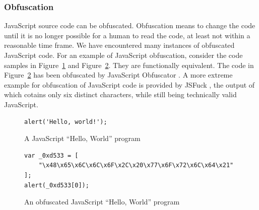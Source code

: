 \documentclass[
    fontsize=12pt,
    headings=small,
    parskip=half,
    bibliography=totoc,
    numbers=noenddot,
    open=any
    ]{scrreprt}
\begin{document}
\subsubsection{Obfuscation}
\label{fundamentals:obfuscation}
JavaScript source code can be obfuscated. Obfuscation means to change the code
until it is no longer possible for a human to read the code, at least not within
a reasonable time frame. We have encountered many instances of obfuscated JavaScript
code. For an example of JavaScript obfuscation, consider the code samples in
Figure~\ref{code:javascript_hello_world} and Figure~\ref{code:javascript_obfuscated}.
They are functionally equivalent. The code in Figure~\ref{code:javascript_obfuscated}
has been obfuscated by JavaScript Obfuscator \cite{jsobfuscator}.
A more extreme example for obfuscation of JavaScript code is provided by JSFuck \cite{jsfuck},
the output of which cotains only six distinct characters, while still being technically valid JavaScript.

\begin{figure}
\centering
\begin{verbatim}
alert('Hello, world!');
\end{verbatim}
\caption{A JavaScript ``Hello, World'' program}
\label{code:javascript_hello_world}
\end{figure}

\begin{figure}
\centering
\begin{verbatim}
var _0xd533 = [
    "\x48\x65\x6C\x6C\x6F\x2C\x20\x77\x6F\x72\x6C\x64\x21"
];
alert(_0xd533[0]);
\end{verbatim}
\caption{An obfuscated JavaScript ``Hello, World'' program}
\label{code:javascript_obfuscated}
\end{figure}
\end{document}
